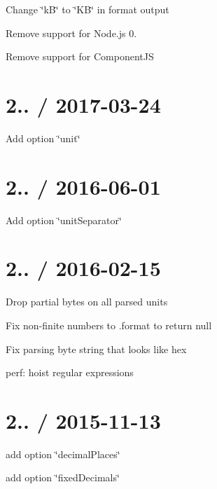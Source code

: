 
\begin{DoxyItemize}
\item Change \char`\"{}k\+B\char`\"{} to \char`\"{}\+K\+B\char`\"{} in format output
\item Remove support for Node.\+js 0.
\item Remove support for Component\+JS
\end{DoxyItemize}

\section*{2.. / 2017-\/03-\/24 }


\begin{DoxyItemize}
\item Add option \char`\"{}unit\char`\"{}
\end{DoxyItemize}

\section*{2.. / 2016-\/06-\/01 }


\begin{DoxyItemize}
\item Add option \char`\"{}unit\+Separator\char`\"{}
\end{DoxyItemize}

\section*{2.. / 2016-\/02-\/15 }


\begin{DoxyItemize}
\item Drop partial bytes on all parsed units
\item Fix non-\/finite numbers to {\ttfamily .format} to return {\ttfamily null}
\item Fix parsing byte string that looks like hex
\item perf\+: hoist regular expressions
\end{DoxyItemize}

\section*{2.. / 2015-\/11-\/13 }


\begin{DoxyItemize}
\item add option \char`\"{}decimal\+Places\char`\"{}
\item add option \char`\"{}fixed\+Decimals\char`\"{}
\end{DoxyItemize}

